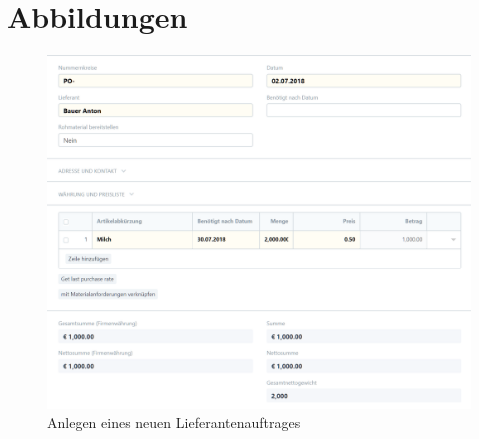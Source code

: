 \chapter{Abbildungen}
\begin{figure}
  \centering
  \includegraphics[width=\textwidth]{Bilder/Lieferantenauftrag.PNG}
  \caption{Anlegen eines neuen Lieferantenauftrages}
  \label{fig:liefAuftrag}
\end{figure}
